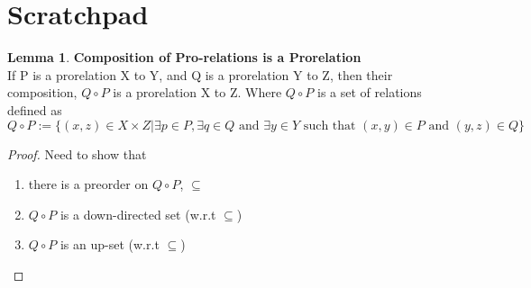 \documentclass[18pt,a4paper]{extarticle}
\theoremstyle{theorem}
\theoremstyle{definition}
\theoremstyle{lemma}
\newtheorem{lemma}{Lemma}[section]
\begin{document}


\newpage
\section{Scratchpad}%

\begin{lemma}{\textbf{Composition of Pro-relations is a Prorelation}} %
	\\
	If P is a prorelation X to Y, and Q is a prorelation Y to Z, then their composition,
	$Q \circ P$ is a prorelation X to Z.
	Where $Q \circ P$ is a set of relations defined as
	\[Q \circ P := \{ (x,z) \in X \times Z |
	\exists p \in P , \exists q \in Q \text{ and } \exists y \in Y
	\text{ such that } (x,y) \in P \text{ and } (y,z) \in Q \} \]
\end{lemma}
\begin{proof}
	Need to show that
	\begin{enumerate}[label=\roman*]
		\item  there is a preorder on $Q \circ P$, $\subseteq$
		\item $Q \circ P$ is a down-directed set (w.r.t $\subseteq$)
		\item $Q \circ P$ is an up-set (w.r.t $\subseteq$)
	\end{enumerate}

\end{proof}


\end{document}
